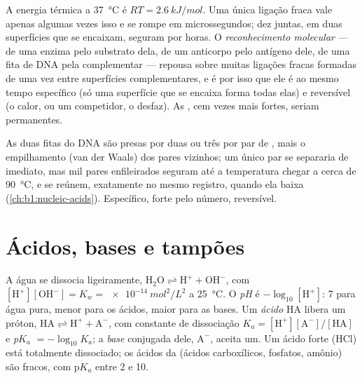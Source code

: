 \begin{proposition}\label{prop:b1:water-small-molecules:weak}
A energia térmica a \qty{37}{\celsius} é $RT = \qty{2.6}{kJ/mol}$. Uma
única ligação fraca vale apenas algumas vezes isso e se rompe em
microssegundos; dez juntas, em duas superfícies que se encaixam, seguram
por horas. O \emph{reconhecimento molecular}
--- de uma enzima pelo substrato dela, de um anticorpo pelo antígeno
dele, de uma fita de DNA pela complementar --- repousa sobre muitas
ligações fracas formadas de uma vez entre superfícies complementares, e
é por isso que ele é ao mesmo tempo específico (só uma superfície que se
encaixa forma todas elas) e reversível (o calor, ou um competidor, o
desfaz). As , cem vezes mais fortes, seriam
permanentes.
\end{proposition}

\begin{example}\label{ex:b1:water-small-molecules:melting}
As duas fitas do DNA são presas por duas ou três 
por par de , mais o empilhamento (van der Waals) dos pares
vizinhos; um único par se separaria de imediato, mas mil pares
enfileirados seguram até a temperatura chegar a cerca de
\qty{90}{\celsius}, e se reúnem, exatamente no mesmo registro, quando
ela baixa (\cref{ch:b1:nucleic-acids}). Específico, forte pelo número,
reversível.
\end{example}

\section{Ácidos, bases e tampões}

\begin{definition}\label{def:b1:water-small-molecules:ph}
A água se dissocia ligeiramente, $\mathrm{H_2O} \rightleftharpoons
\mathrm{H^+} + \mathrm{OH^-}$, com $[\mathrm{H^+}][\mathrm{OH^-}] =
K_w = \qty{e-14}{mol^2/L^2}$ a \qty{25}{\celsius}. O
\emph{pH} é $-\log_{10}[\mathrm{H^+}]$: 7 para água pura,
menor para os ácidos, maior para as bases. Um \emph{ácido}
$\mathrm{HA}$ libera um próton, $\mathrm{HA} \rightleftharpoons \mathrm{H^+} +
\mathrm{A^-}$, com constante de dissociação $K_a =
[\mathrm{H^+}][\mathrm{A^-}]/[\mathrm{HA}]$ e
\emph{p$K_a$} $= -\log_{10}K_a$; a
\emph{base} conjugada dele, $\mathrm{A^-}$, aceita um. Um
ácido forte (HCl) está totalmente dissociado; os ácidos da 
(ácidos carboxílicos, fosfatos, amônio) são fracos, com p$K_a$ entre 2
e 10.
\end{definition}

